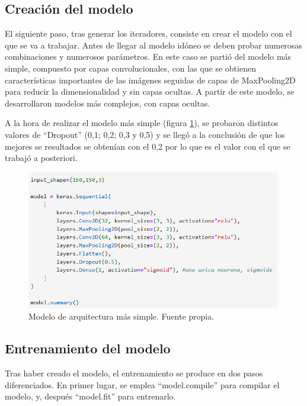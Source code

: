 \subsection{Creación del modelo}

El siguiente paso, tras generar los iteradores, consiste en crear el modelo con el que se va a trabajar. Antes de llegar al modelo idóneo se deben probar numerosas combinaciones y numerosos parámetros. En este caso se partió del modelo más simple, compuesto por capas convolucionales, con las que se obtienen características importantes de las imágenes seguidas de capas de MaxPooling2D para reducir la dimensionalidad y sin capas ocultas. A partir de este modelo, se desarrollaron modelos más complejos, con capas ocultas.

A la hora de realizar el modelo más simple (figura \ref{fig:arquitectura_simple}), se probaron distintos valores de ``Dropout'' (0,1; 0,2; 0,3 y 0,5) y se llegó a la conclusión de que los mejores se resultados se obtenían con el 0,2 por lo que es el valor con el que se trabajó a posteriori.

\begin{figure}[h]
    \centering
    \includegraphics[width=0.99\textwidth]{img/arquitectura_simple.PNG}
    \caption{Modelo de arquitectura más simple. Fuente propia.}
    \label{fig:arquitectura_simple}
\end{figure}
\FloatBarrier

\subsection{Entrenamiento del modelo}

Tras haber creado el modelo, el entrenamiento se produce en dos pasos diferenciados. En primer lugar, se emplea ``model.compile'' para compilar el modelo, y, después ``model.fit'' para entrenarlo.

